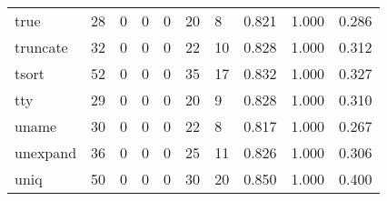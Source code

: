 \begin{longtable}{lp{1.3cm}p{1.3cm}p{1.3cm}p{1.3cm}p{1.3cm}p{1.3cm}p{1.3cm}p{1.3cm}p{1.3cm}}
true      &                     28 &                                             0 &                                            0 &                                           0 &                                           20 &                                          8 &                                0.821 &                                  1.000 &                                0.286 \\
truncate  &                     32 &                                             0 &                                            0 &                                           0 &                                           22 &                                         10 &                                0.828 &                                  1.000 &                                0.312 \\
tsort     &                     52 &                                             0 &                                            0 &                                           0 &                                           35 &                                         17 &                                0.832 &                                  1.000 &                                0.327 \\
tty       &                     29 &                                             0 &                                            0 &                                           0 &                                           20 &                                          9 &                                0.828 &                                  1.000 &                                0.310 \\
uname     &                     30 &                                             0 &                                            0 &                                           0 &                                           22 &                                          8 &                                0.817 &                                  1.000 &                                0.267 \\
unexpand  &                     36 &                                             0 &                                            0 &                                           0 &                                           25 &                                         11 &                                0.826 &                                  1.000 &                                0.306 \\
uniq      &                     50 &                                             0 &                                            0 &                                           0 &                                           30 &                                         20 &                                0.850 &                                  1.000 &                                0.400 \\

\end{longtable}
